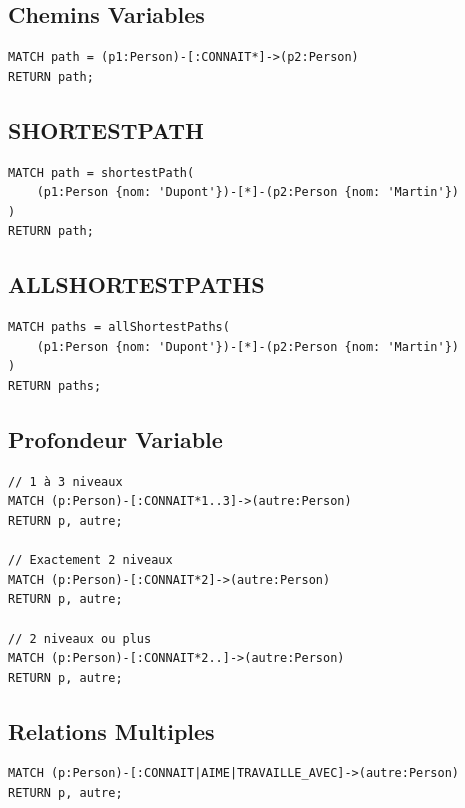 \documentclass[11pt,a4paper]{article}
\begin{document}
\subsection{Chemins Variables}

\begin{lstlisting}
MATCH path = (p1:Person)-[:CONNAIT*]->(p2:Person)
RETURN path;
\end{lstlisting}

\subsection{SHORTESTPATH}

\begin{lstlisting}
MATCH path = shortestPath(
    (p1:Person {nom: 'Dupont'})-[*]-(p2:Person {nom: 'Martin'})
)
RETURN path;
\end{lstlisting}

\subsection{ALLSHORTESTPATHS}

\begin{lstlisting}
MATCH paths = allShortestPaths(
    (p1:Person {nom: 'Dupont'})-[*]-(p2:Person {nom: 'Martin'})
)
RETURN paths;
\end{lstlisting}

\subsection{Profondeur Variable}

\begin{lstlisting}
// 1 à 3 niveaux
MATCH (p:Person)-[:CONNAIT*1..3]->(autre:Person)
RETURN p, autre;

// Exactement 2 niveaux
MATCH (p:Person)-[:CONNAIT*2]->(autre:Person)
RETURN p, autre;

// 2 niveaux ou plus
MATCH (p:Person)-[:CONNAIT*2..]->(autre:Person)
RETURN p, autre;
\end{lstlisting}

\subsection{Relations Multiples}

\begin{lstlisting}
MATCH (p:Person)-[:CONNAIT|AIME|TRAVAILLE_AVEC]->(autre:Person)
RETURN p, autre;
\end{lstlisting}
\end{document}

